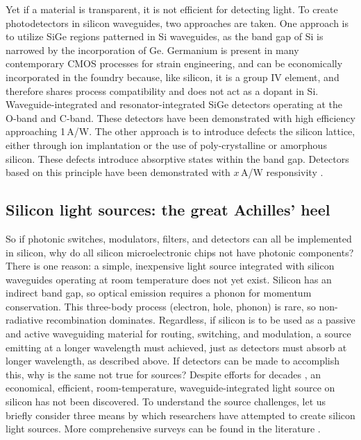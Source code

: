 \documentclass[twocolumn]{article}
\begin{document}
Yet if a material is transparent, it is not efficient for detecting light. To create photodetectors in silicon waveguides, two approaches are taken. One approach is to utilize SiGe regions patterned in Si waveguides, as the band gap of Si is narrowed by the incorporation of Ge. Germanium is present in many contemporary CMOS processes for strain engineering, and can be economically incorporated in the foundry because, like silicon, it is a group IV element, and therefore shares process compatibility and does not act as a dopant in Si. Waveguide-integrated \cite{} and resonator-integrated \cite{} SiGe detectors operating at the O-band and C-band. These detectors have been demonstrated with high efficiency approaching 1\,A/W. The other approach is to introduce defects the silicon lattice, either through ion implantation or the use of poly-crystalline or amorphous silicon. These defects introduce absorptive states within the band gap. Detectors based on this principle have been demonstrated with $x$\,A/W responsivity \cite{meor2014}. 

\subsection{Silicon light sources: the great Achilles' heel}
So if photonic switches, modulators, filters, and detectors can all be implemented in silicon, why do all silicon microelectronic chips not have photonic components? There is one reason: a simple, inexpensive light source integrated with silicon waveguides operating at room temperature does not yet exist. Silicon has an indirect band gap, so optical emission requires a phonon for momentum conservation. This three-body process (electron, hole, phonon) is rare, so non-radiative recombination dominates. Regardless, if silicon is to be used as a passive and active waveguiding material for routing, switching, and modulation, a source emitting at a longer wavelength must achieved, just as detectors must absorb at longer wavelength, as described above. If detectors can be made to accomplish this, why is the same not true for sources? Despite efforts for decades \cite{shxu2007}, an economical, efficient, room-temperature, waveguide-integrated light source on silicon has not been discovered. To understand the source challenges, let us briefly consider three means by which researchers have attempted to create silicon light sources. More comprehensive surveys can be found in the literature \cite{li2005,shxu2007,libo2010,zhyi2015}.
\end{document}
